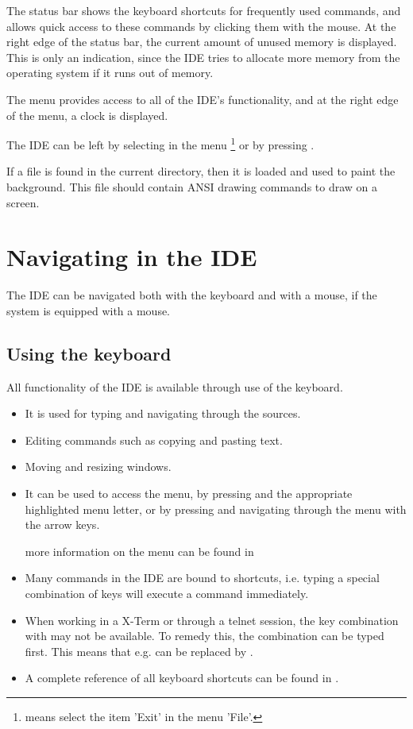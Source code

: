 The status bar shows the keyboard shortcuts for frequently used 
commands, and allows quick access to these commands by clicking 
them with the mouse. 
At the right edge of the status bar, the current amount of unused 
memory is displayed. This is only an indication, since the IDE 
tries to allocate more memory from the operating system if it 
runs out of memory.

The menu provides access to all of the IDE's functionality, and
at the right edge of the menu, a clock is displayed.

The IDE can be left by selecting  in the menu
\footnote{ means select the item 'Exit' in the menu 'File'.}
or by pressing .

\begin{remark}
If a file  is found in the current directory,
then it is loaded and used to paint the background.
This file should contain ANSI drawing commands to draw on a screen.
\end{remark}

\section{Navigating in the IDE}
The IDE can be navigated both with the keyboard and with a mouse, if the
system is equipped with a mouse.
%
%
\subsection{Using the keyboard} 
All functionality of the IDE is available through use of the keyboard.
\begin{itemize}
\item It is used for typing and navigating through the sources.
\item Editing commands such as copying and pasting text.
\item Moving and resizing windows.
\item It can be used to access the menu, by pressing  and the
appropriate highlighted menu letter, or by pressing  and
navigating through the menu with the arrow keys.

more information on the menu can be found in 
\item Many commands in the IDE are bound to shortcuts, i.e. typing a special
combination of keys will execute a command immediately.
\end{itemize}
\begin{remark}
\begin{itemize}
\item When working in a \linux X-Term or through a telnet session, the
key combination with  may not be available. To remedy this, the 
 combination can be typed first. This means that e.g. 
can be replaced by .
\item A complete reference of all keyboard shortcuts can be found in
.
\end{itemize}
\end{remark}
% 
%
